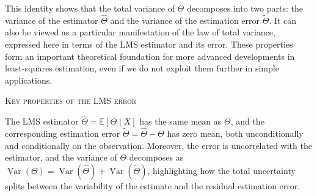 This identity shows that the total variance of \(\Theta\) decomposes into two parts: the variance of the estimator \(\hat{\Theta}\) and the variance of the estimation error \(\tilde{\Theta}\).  
It can also be viewed as a particular manifestation of the law of total variance, expressed here in terms of the LMS estimator and its error.  
These properties form an important theoretical foundation for more advanced developments in least-squares estimation, even if we do not exploit them further in simple applications.

\bigskip
\textsc{Key properties of the LMS error}

The LMS estimator \(\hat{\Theta} = \mathbb{E}[\Theta \mid X]\) has the same mean as \(\Theta\), and the corresponding estimation error \(\tilde{\Theta} = \hat{\Theta} - \Theta\) has zero mean, both unconditionally and conditionally on the observation.  
Moreover, the error is uncorrelated with the estimator, and the variance of \(\Theta\) decomposes as \(\operatorname{Var}(\Theta) = \operatorname{Var}(\hat{\Theta}) + \operatorname{Var}(\tilde{\Theta})\), highlighting how the total uncertainty splits between the variability of the estimate and the residual estimation error.